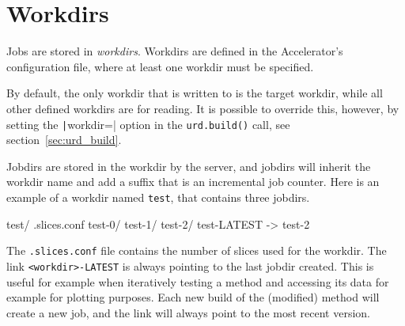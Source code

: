 
\section{Workdirs}
Jobs are stored in \textsl{workdirs}.  Workdirs are defined in the
Accelerator's configuration file, where at least one workdir must be
specified.

By default, the only workdir that is written to is the target workdir,
while all other defined workdirs are for reading.  It is possible to
override this, however, by setting the \texttt|workdir=|
option in the \texttt{urd.build()} call, see
section~\ref{sec:urd_build}.

Jobdirs are stored in the workdir by the server, and jobdirs will
inherit the workdir name and add a suffix that is an incremental job
counter.  Here is an example of a workdir named \texttt{test}, that
contains three jobdirs.
\begin{shell}
test/
    .slices.conf
    test-0/
    test-1/
    test-2/
    test-LATEST -> test-2
\end{shell}
The \texttt{.slices.conf} file contains the number of slices used for
the workdir.  The link \texttt{<workdir>-LATEST} is always pointing to
the last jobdir created.  This is useful for example when iteratively
testing a method and accessing its data for example for plotting
purposes.  Each new build of the (modified) method will create a new
job, and the link will always point to the most recent
version.


